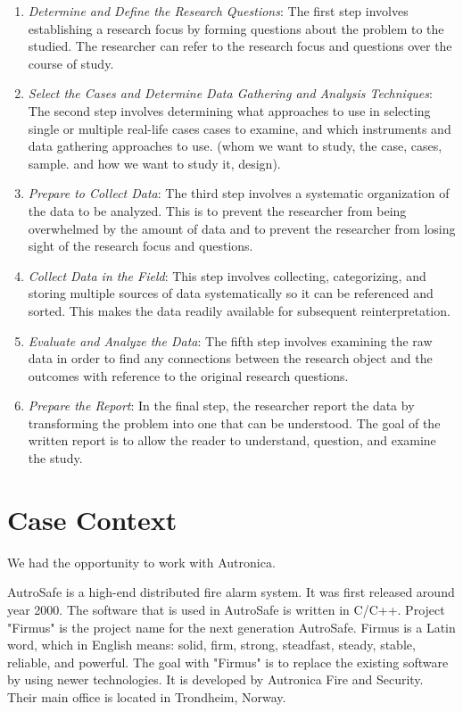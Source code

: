 \begin{enumerate}
	\item \textit{Determine and Define the Research Questions}: The first step involves establishing a research focus by forming questions about the problem to the studied. The researcher can refer to the research focus and questions over the course of study. 
	\item \textit{Select the Cases and Determine Data Gathering and Analysis Techniques}: The second step involves determining what approaches to use in selecting single or multiple real-life cases cases to examine, and which instruments and data gathering approaches to use. (whom we want to study, the case, cases, sample. and how we want to study it, design).
	\item \textit{Prepare to Collect Data}: The third step involves a systematic organization of the data to be analyzed. This is to prevent the researcher from being overwhelmed by the amount of data and to prevent the researcher from losing sight of the research focus and questions. 
	\item \textit{Collect Data in the Field}: This step involves collecting, categorizing, and storing multiple sources of data systematically so it can be referenced and sorted. This makes the data readily available for subsequent reinterpretation. 
	\item \textit{Evaluate and Analyze the Data}: The fifth step involves examining the raw data in order to find any connections between the research object and the outcomes with reference to the original research questions. 
	\item \textit{Prepare the Report}: In the final step, the researcher report the data by transforming the problem into one that can be understood. The goal of the written report is to allow the reader to understand, question, and examine the study.
\end{enumerate}

\section{Case Context}
We had the opportunity to work with Autronica. 

AutroSafe is a high-end distributed fire alarm system. It was first released around year 2000. The software that is used in AutroSafe is written in C/C++. Project "Firmus" is the project name for the next generation AutroSafe. Firmus is a Latin word, which in English means: solid, firm, strong, steadfast, steady, stable, reliable, and powerful. The goal with "Firmus" is to replace the existing software by using newer technologies. It is developed by Autronica Fire and Security. Their main office is located in Trondheim, Norway. 

